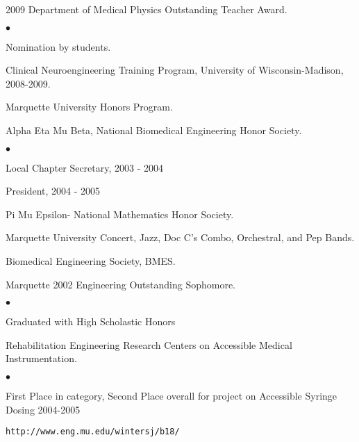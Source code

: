 \documentclass[margin,line]{res}
\newenvironment{list2}{
  \begin{list}{$\bullet$}{%
      \setlength{\itemsep}{0in}
      \setlength{\parsep}{0in} \setlength{\parskip}{0in}
      \setlength{\topsep}{0in} \setlength{\partopsep}{0in}
      \setlength{\leftmargin}{0.2in}}}{\end{list}}
\begin{document}
\begin{resume}
2009 Department of Medical Physics Outstanding Teacher Award.
\begin{list2}
\item  Nomination by students.
\end{list2}

Clinical Neuroengineering Training Program, University of Wisconsin-Madison,
2008-2009.

Marquette University Honors Program.

Alpha Eta Mu Beta, National Biomedical Engineering Honor Society.
\begin{list2}
 \item Local Chapter Secretary, 2003 - 2004
 \item President, 2004 - 2005
\end{list2}

Pi Mu Epsilon- National Mathematics Honor Society.

Marquette University Concert, Jazz, Doc C's Combo, Orchestral, and Pep Bands.

Biomedical Engineering Society, BMES.

Marquette 2002 Engineering Outstanding Sophomore.
\begin{list2}
\item Graduated with High Scholastic Honors
\end{list2}

Rehabilitation Engineering Research Centers on Accessible Medical
Instrumentation.
\begin{list2}
 \item First Place in category, Second Place overall for project on Accessible Syringe Dosing 2004-2005
 \item \begin{verbatim}http://www.eng.mu.edu/wintersj/b18/\end{verbatim}
\end{list2}
%





\end{resume}
\end{document}
